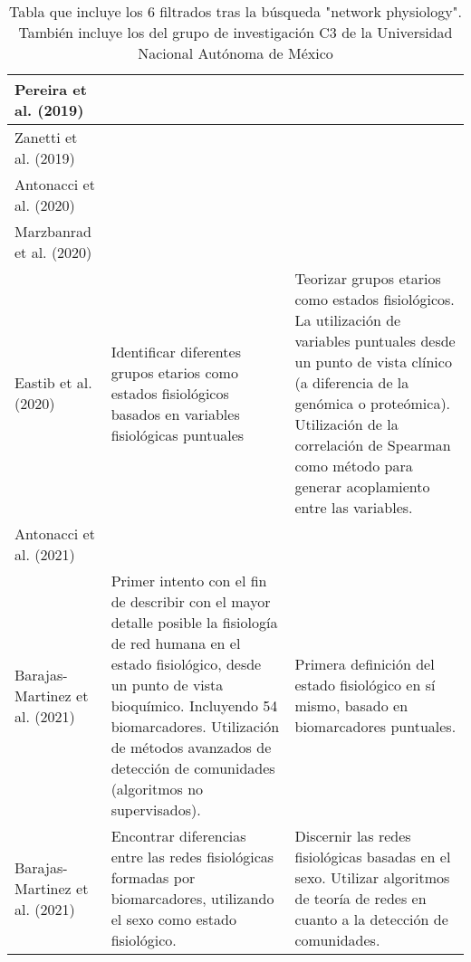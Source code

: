 \documentclass[twoside,twocolumn]{article}
\begin{document}
\begin{center}
\begin{table}[t]
\begin{tabular}{|p{4cm}p{6cm}p{5cm}|}
      Pereira et al. (2019) \cite{pereira2019complex} &
      &
      \\\hline
      Zanetti et al. (2019) \cite{zanetti2019information} &
      &
      \\\hline
      Antonacci et al. (2020) \cite{antonacci2020information} &
      &
      \\\hline
      Marzbanrad et al. (2020) \cite{tan2020organ} &
      &
      \\ \hline
      Eastib et al. (2020) \cite{easton2020metabolic} &
      Identificar diferentes grupos etarios como estados fisiológicos basados en variables fisiológicas puntuales
      &
      Teorizar grupos etarios como estados fisiológicos.
      La utilización de variables puntuales desde un punto de vista clínico (a diferencia de la genómica o proteómica).
      Utilización de la correlación de Spearman como método para generar acoplamiento entre las variables.
      \\\hline
      Antonacci et al. (2021) \cite{antonacci2021estimation} &
      &
      \\\hline
      Barajas-Martinez et al. (2021) \cite{barajas2021physiological}
      &
      Primer intento con el fin de describir con el mayor detalle posible la fisiología de red humana en el estado fisiológico, desde un punto de vista bioquímico. Incluyendo 54 biomarcadores.
      Utilización de métodos avanzados de detección de comunidades (algoritmos no supervisados).
      &
      Primera definición del estado fisiológico en sí mismo, basado en biomarcadores puntuales.
      \\\hline
      Barajas-Martinez et al. (2021) \cite{barajas2021sex}
      &
      Encontrar diferencias entre las redes fisiológicas formadas por biomarcadores, utilizando el sexo como estado fisiológico.
      &
      Discernir las redes fisiológicas basadas en el sexo.
      Utilizar algoritmos de teoría de redes en cuanto a la detección de comunidades.
      \\\hline
    \end{tabular}
    \caption{Tabla que incluye los 6 filtrados tras la búsqueda "network physiology". También incluye los del grupo de investigación C3 de la Universidad Nacional Autónoma de México}
    \label{tab:allGroups}
  \end{table}
\end{center}
\twocolumn
\renewcommand\refname{Referencias}
\printbibliography
\end{document}
